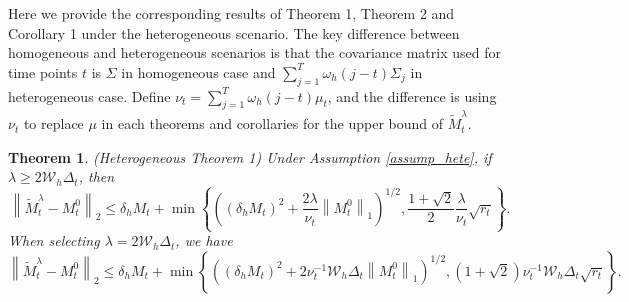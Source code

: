 \documentclass[12pt]{article}
\newtheorem{thm}{Theorem}
\begin{document}
Here we provide the corresponding results of Theorem 1, Theorem 2 and Corollary 1 under the heterogeneous scenario. The key difference between homogeneous and heterogeneous scenarios is that the covariance matrix used for time points $t$ is $\Sigma$ in homogeneous case and $\sum_{j=1}^T \omega_h(j-t) \Sigma_j$ in heterogeneous case. Define $\nu_t = \sum_{j=1}^T\omega_h (j-t) \mu_t$, and the difference is using $\nu_t$ to replace $\mu$ in each theorems and corollaries for the upper bound of $\widetilde{M}_t^\lambda$.


\begin{thm}
(Heterogeneous Theorem 1) 
  Under Assumption \ref{assump_hete}, if $\lambda \ge 2\mathcal{W}_h\Delta_{t}$, then
  \begin{equation}
   \label{eq_thm_error_bound_hete}
  \left\|\widetilde{M}_t^\lambda - M_t^0\right\|_2 \le\delta_h M_t +\min\left\{ \left((\delta_h M_t)^2 + \frac{2\lambda}{\nu_t}\left\|M_t^0\right\|_1\right)^{1/2}, \frac{1+\sqrt{2}}{2} \frac{\lambda}{\nu_t}\sqrt{r_t}\right\}.
  \end{equation}
  When selecting $\lambda=2\mathcal{W}_h\Delta_{t}$, we have
  \begin{equation}
  \label{proposed_bound_hete}
  \left\|\widetilde{M}_t^\lambda - M_t^0\right\|_2 \le\delta_h M_{t} + \min\left\{\left((\delta_h M_{t})^2 + 2\nu_t^{-1}\mathcal{W}_h\Delta_{t}\left\|M_t^0\right\|_1\right)^{1/2},{(1+\sqrt{2})}{\nu_t^{-1}}{\mathcal{W}_h\Delta_{t}}\sqrt{r_t}\right\}.
  \end{equation}
\end{thm}
\end{document}
